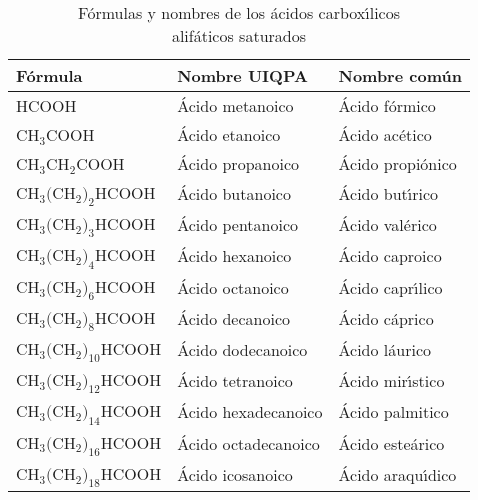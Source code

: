 \begin{table}[bht]
\caption[\'Acidos carbox\'{\i}licos]{F\'ormulas y nombres de los \'acidos
carbox\'{\i}licos\\ alif\'aticos saturados}
\label{grasos}
{\small \begin{tabular}{lll}\hline
\textbf{F\'ormula}&\textbf{Nombre UIQPA}& \textbf{Nombre com\'un}\\ \hline
HCOOH                 &\'Acido metanoico      &\'Acido f\'ormico\\
CH$_3$COOH            &\'Acido etanoico       &\'Acido ac\'etico\\
CH$_3$CH$_2$COOH      &\'Acido propanoico      &\'Acido propi\'onico\\
CH$_3($CH$_2)_2$HCOOH &\'Acido butanoico      &\'Acido but\'{\i}rico\\
CH$_3($CH$_2)_3$HCOOH &\'Acido pentanoico     &\'Acido val\'erico\\
CH$_3($CH$_2)_4$HCOOH &\'Acido hexanoico      &\'Acido caproico\\
CH$_3($CH$_2)_6$HCOOH &\'Acido octanoico      &\'Acido capr\'{\i}lico\\
CH$_3($CH$_2)_8$HCOOH &\'Acido decanoico      &\'Acido c\'aprico\\
CH$_3($CH$_2)_{10}$HCOOH&\'Acido dodecanoico    &\'Acido l\'aurico\\
CH$_3($CH$_2)_{12}$HCOOH&\'Acido tetranoico     &\'Acido mir\'{\i}stico\\
CH$_3($CH$_2)_{14}$HCOOH&\'Acido hexadecanoico  &\'Acido palmitico\\
CH$_3($CH$_2)_{16}$HCOOH&\'Acido octadecanoico  &\'Acido este\'arico\\
CH$_3($CH$_2)_{18}$HCOOH&\'Acido icosanoico     &\'Acido
araqu\'{\i}dico\\\hline
\end{tabular}}
\end{table}


